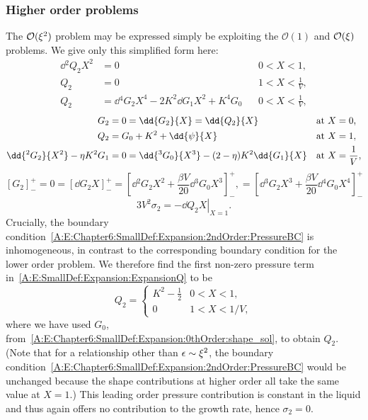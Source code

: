 \begin{subappendices}
\subsubsection{Higher order problems}
The  $\mathcal{O}(\xi^2)$ problem may be expressed simply be exploiting the  $\mathcal{O}(1)$ and $\mathcal{O}(\xi)$ problems. We give only this simplified form here:
\begin{align}
 \dd{^2 Q_2}{X^2}&=0 & &0 < X<1,\\
Q_2 &= 0 & &1 < X< \frac{1}{V},\\
Q_2 &= \dd{^4 G_2}{X^4} - 2K^2\dd{G_1}{X^2}+ K^4 G_0 & & 0 < X < \frac{1}{V},
\end{align}
\begin{align}
G_2 &= 0 = \dd{G_2}{X}= \dd{Q_2}{X} & &\text{at}~X = 0,\\
Q_2 &=G_0+ K^2+ \dd{\psi}{X} & &\text{at}~X = 1,\label{A:E:Chapter6:SmallDef:Expansion:2ndOrder:PressureBC}\\
\dd{^2 G_2}{X^2} - \poisson K^2 G_1 &=0 = \dd{^3 G_0}{X^3}  - (2- \poisson)K^2 \dd{G_1}{X}& &\text{at}~X = \frac{1}{V},
\end{align}
\begin{equation}
\left[G_2\right]_-^+ =0 = \left[\dd{G_2}{X}\right]_-^+ = \left[\dd{^2 G_2}{X^2} + \frac{\beta V}{20}\dd{^3G_0}{X^3}\right]_-^+, = \left[\dd{^3 G_2}{X^3} + \frac{\beta V}{20}\dd{^4 G_0}{X^4}\right]_-^+
\end{equation}
\begin{equation}
3V^2 \sigma_2 = -\left.\dd{Q_2}{X}\right|_{X=1}.
\end{equation}
Crucially, the boundary condition~\eqref{A:E:Chapter6:SmallDef:Expansion:2ndOrder:PressureBC} is inhomogeneous, in contrast to the corresponding boundary condition for the lower order problem. We therefore find the first non-zero pressure term in~\eqref{A:E:SmallDef:Expansion:ExpansionQ} to be
\begin{equation}\label{A:E:Chapter6:SmallDef:Expansion:2ndOrder:solQ2}
Q_2 = \begin{cases}
K^2 - \frac{1}{2} & 0 <X  < 1,\\
0 & 1 < X < 1/V,
\end{cases}
\end{equation}
where we have used $G_0$, from~\eqref{A:E:Chapter6:SmallDef:Expansion:0thOrder:shape_sol}, to obtain $Q_2$. (Note that for a relationship other than $\epsilon\sim \xi^2$, the boundary condition~\eqref{A:E:Chapter6:SmallDef:Expansion:2ndOrder:PressureBC} would be unchanged because the shape contributions at higher order all take the same value at $ X= 1$.) This leading order pressure contribution is constant in the liquid and thus again offers no contribution to the growth rate, hence $\sigma_2 = 0$.


\end{subappendices}
